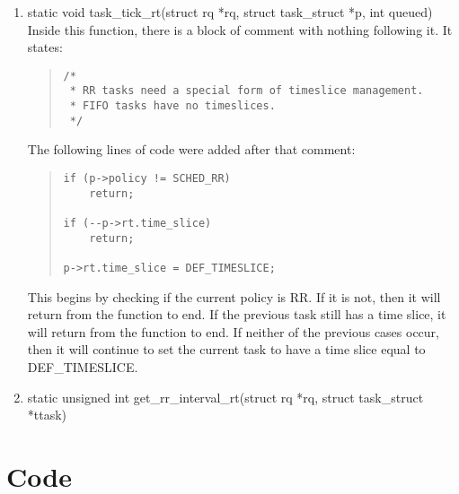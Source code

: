 \documentclass[letterpaper,10pt,titlepage]{article}
\begin{document}
\begin{enumerate}[resume]
\item static void task\_tick\_rt(struct rq *rq, struct task\_struct *p, int queued)
Inside this function, there is a block of comment with nothing following it. It states:
\begin{quotation}
\begin{lstlisting}
/*
 * RR tasks need a special form of timeslice management.
 * FIFO tasks have no timeslices.
 */
\end{lstlisting}
\end{quotation}
The following lines of code were added after that comment:
\begin{quotation}
\begin{lstlisting}
if (p->policy != SCHED_RR)
    return;

if (--p->rt.time_slice)
    return;

p->rt.time_slice = DEF_TIMESLICE;
\end{lstlisting}
\end{quotation}
This begins by checking if the current policy is RR. If it is not, then it will return from the function to end. If the previous task still has a time slice, it will return from the function to end. If neither of the previous cases occur, then it will continue to set the current task to have a time slice equal to DEF\_TIMESLICE.


\item static unsigned int get\_rr\_interval\_rt(struct rq *rq, struct task\_struct *ttask)

\end{enumerate}

\section{Code}

\end{document}
